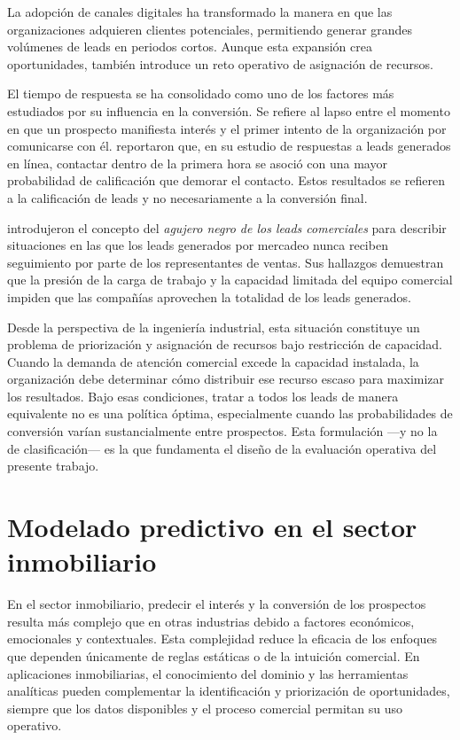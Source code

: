 La adopción de canales digitales ha transformado la manera en que las
organizaciones adquieren clientes potenciales, permitiendo generar grandes
volúmenes de leads en periodos cortos. Aunque esta expansión crea oportunidades,
también introduce un reto operativo de asignación de recursos.

El tiempo de respuesta se ha consolidado como uno de los factores más estudiados
por su influencia en la conversión. Se refiere al lapso entre el momento en que un
prospecto manifiesta interés y el primer intento de la organización por
comunicarse con él.  reportaron que, en su estudio de
respuestas a leads generados en línea, contactar dentro de la primera hora se
asoció con una mayor probabilidad de calificación que demorar el contacto. Estos
resultados se refieren a la calificación de leads y no necesariamente a la
conversión final.

 introdujeron el concepto del \emph{agujero negro de los
leads comerciales} para describir situaciones en las que los leads generados por
mercadeo nunca reciben seguimiento por parte de los representantes de ventas. Sus
hallazgos demuestran que la presión de la carga de trabajo y la capacidad limitada
del equipo comercial impiden que las compañías aprovechen la totalidad de los leads
generados.

Desde la perspectiva de la ingeniería industrial, esta situación constituye un
problema de priorización y asignación de recursos bajo restricción de
capacidad. Cuando la demanda de atención comercial excede la capacidad instalada,
la organización debe determinar cómo distribuir ese recurso escaso para maximizar
los resultados. Bajo esas condiciones, tratar a todos los leads de manera
equivalente no es una política óptima, especialmente cuando las probabilidades de
conversión varían sustancialmente entre prospectos. Esta formulación —y no la de
clasificación— es la que fundamenta el diseño de la evaluación operativa del
presente trabajo.

\section{Modelado predictivo en el sector inmobiliario}

En el sector inmobiliario, predecir el interés y la conversión de los prospectos
resulta más complejo que en otras industrias debido a factores económicos,
emocionales y contextuales. Esta complejidad reduce la eficacia de los enfoques
que dependen únicamente de reglas estáticas o de la intuición comercial. En
aplicaciones inmobiliarias, el conocimiento del dominio y las herramientas
analíticas pueden complementar la identificación y priorización de oportunidades,
siempre que los datos disponibles y el proceso comercial permitan su uso
operativo.

